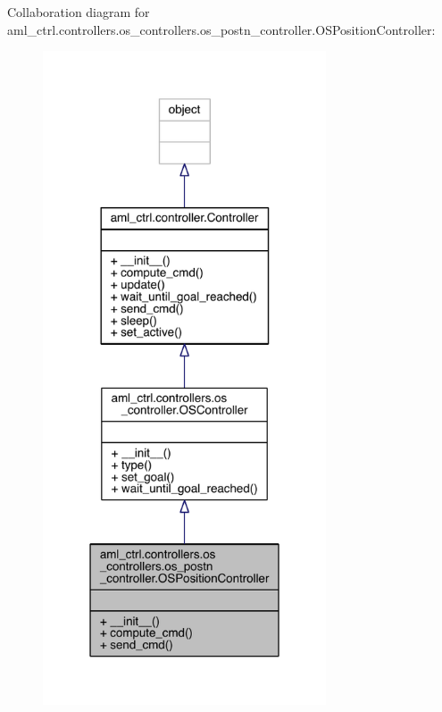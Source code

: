 Collaboration diagram for aml\+\_\+ctrl.\+controllers.\+os\+\_\+controllers.\+os\+\_\+postn\+\_\+controller.\+O\+S\+Position\+Controller\+:\nopagebreak
\begin{figure}[H]
\begin{center}
\leavevmode
\includegraphics[width=238pt]{classaml__ctrl_1_1controllers_1_1os__controllers_1_1os__postn__controller_1_1_o_s_position_controller__coll__graph}
\end{center}
\end{figure}
